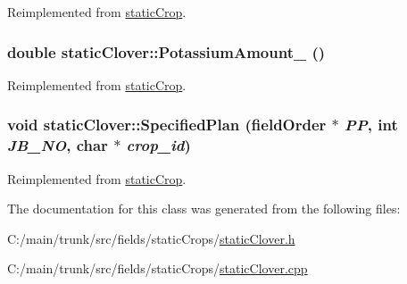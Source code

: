 Reimplemented from \hyperlink{classstatic_crop_abaa5c59d4074d47dedc79172f8326e08}{staticCrop}.\hypertarget{classstatic_clover_acda5feff98054d16c5a29d5c283ae14d}{
\subsubsection[{PotassiumAmount\_\-}]{\setlength{\rightskip}{0pt plus 5cm}double staticClover::PotassiumAmount\_\- ()}}
\label{classstatic_clover_acda5feff98054d16c5a29d5c283ae14d}


Reimplemented from \hyperlink{classstatic_crop_a41fee98d728c7670e6acb504a9b3459d}{staticCrop}.\hypertarget{classstatic_clover_a947279b029c4cbd26ba1e11efbefe0fc}{
\subsubsection[{SpecifiedPlan}]{\setlength{\rightskip}{0pt plus 5cm}void staticClover::SpecifiedPlan ({\bf fieldOrder} $\ast$ {\em PP}, \/  int {\em JB\_\-NO}, \/  char $\ast$ {\em crop\_\-id})}}
\label{classstatic_clover_a947279b029c4cbd26ba1e11efbefe0fc}


Reimplemented from \hyperlink{classstatic_crop_af19d8a1e4f4833325f6712c22ede8b45}{staticCrop}.

The documentation for this class was generated from the following files:\begin{DoxyCompactItemize}
\item 
C:/main/trunk/src/fields/staticCrops/\hyperlink{static_clover_8h}{staticClover.h}\item 
C:/main/trunk/src/fields/staticCrops/\hyperlink{static_clover_8cpp}{staticClover.cpp}\end{DoxyCompactItemize}
